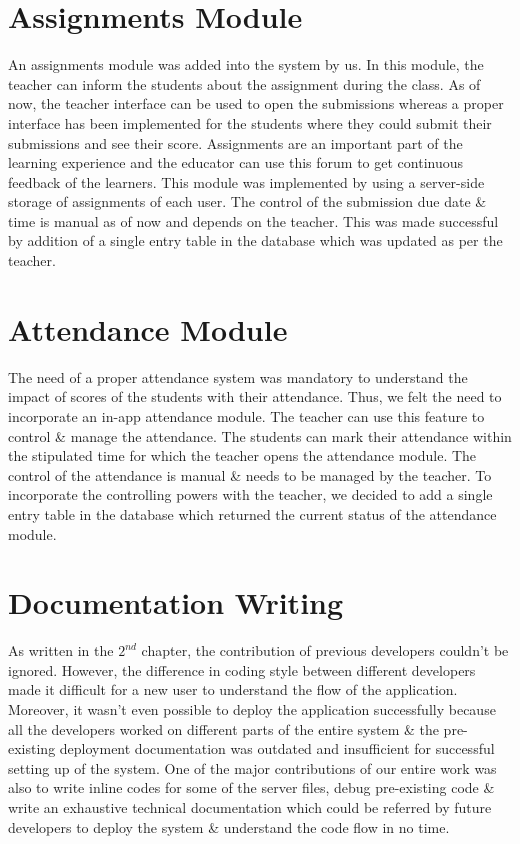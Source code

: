 \documentclass[10pt]{report}
\begin{document}
\section{Assignments Module}
An assignments module was added into the system by us. In this module, the teacher can inform the students about the assignment during the class. As of now, the teacher interface can be used to open the submissions whereas a proper interface has been implemented for the students where they could submit their submissions and see their score. Assignments are an important part of the learning experience and the educator can use this forum to get continuous feedback of the learners. This module was implemented by using a server-side storage of assignments of each user. The control of the submission due date \& time is manual as of now and depends on the teacher. This was made successful by addition of a single entry table in the database which was updated as per the teacher.  
\section{Attendance Module}
The need of a proper attendance system was mandatory to understand the impact of scores of the students with their attendance. Thus, we felt the need to incorporate an in-app attendance module. The teacher can use this feature to control \& manage the attendance. The students can mark their attendance within the stipulated time for which the teacher opens the attendance module. The control of the attendance is manual \& needs to be managed by the teacher. To incorporate the controlling powers with the teacher, we decided to add a single entry table in the database which returned the current status of the attendance module.   
\section{Documentation Writing}
As written in the $2^{nd}$ chapter, the contribution of previous developers couldn't be ignored. However, the difference in coding style between different developers made it difficult for a new user to understand the flow of the application. Moreover, it wasn't even possible to deploy the application successfully because all the developers worked on different parts of the entire system \& the pre-existing deployment documentation was outdated and insufficient for successful setting up of the system. One of the major contributions of our entire work was also to write inline codes for some of the server files, debug pre-existing code \& write an exhaustive technical documentation which could be referred by future developers to deploy the system \& understand the code flow in no time.   
\end{document}
